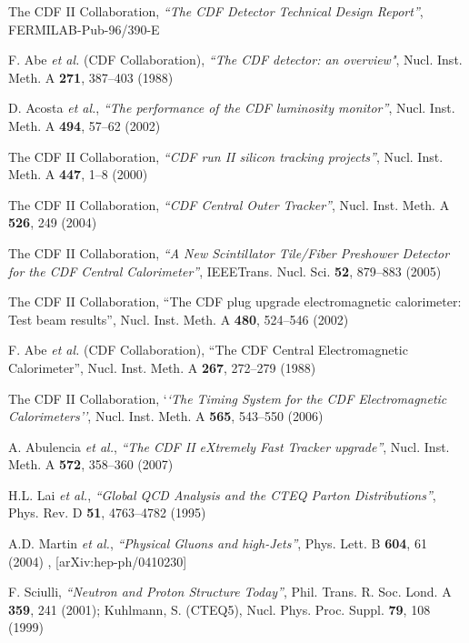 \begin{thebibliography}{1}
 The CDF II Collaboration, \textit{``The CDF Detector Technical Design Report''}, FERMILAB-Pub-96/390-E

 F. Abe \textit{et al.} (CDF Collaboration), \textit{``The CDF detector: an overview"}, Nucl. Inst. Meth. A \textbf{271}, 387--403 (1988)

 D. Acosta \textit{et al.}, \textit{``The performance of the CDF luminosity monitor''}, Nucl. Inst. Meth. A \textbf{494}, 57--62 (2002)

 The CDF II Collaboration, \textit{``CDF run II silicon tracking projects''}, Nucl. Inst. Meth. A \textbf{447}, 1--8 (2000)

 The CDF II Collaboration, \textit{``CDF Central Outer Tracker''}, Nucl. Inst. Meth. A \textbf{526}, 249 (2004)

 The CDF II Collaboration, \textit{``A New Scintillator Tile/Fiber Preshower Detector for the CDF Central Calorimeter''}, IEEETrans. Nucl. Sci. \textbf{52}, 879--883 (2005)

 The CDF II Collaboration, ``The CDF plug upgrade electromagnetic calorimeter: Test beam results'', Nucl. Inst. Meth. A \textbf{480}, 524--546 (2002)

 F. Abe \textit{et al.} (CDF Collaboration), ``The CDF Central Electromagnetic Calorimeter'', Nucl. Inst. Meth. A \textbf{267}, 272--279 (1988)

 The CDF II Collaboration, `\textit{`The Timing System for the CDF Electromagnetic Calorimeters''}, Nucl. Inst. Meth. A \textbf{565}, 543--550 (2006)

 A. Abulencia \textit{et al.}, \textit{``The CDF II eXtremely Fast Tracker upgrade''}, Nucl. Inst. Meth. A \textbf{572}, 358--360 (2007)

 H.L. Lai \textit{et al.}, \textit{``Global QCD Analysis and the CTEQ Parton Distributions''}, Phys. Rev. D \textbf{51}, 4763--4782 (1995)

 A.D. Martin {\it et al.}, \textit{``Physical Gluons and high-\et Jets''}, Phys. Lett. B \textbf{604}, 61 (2004) , [arXiv:hep-ph/0410230]

 F. Sciulli, \textit{``Neutron and Proton Structure Today''}, Phil. Trans. R. Soc. Lond. A \textbf{359}, 241 (2001); Kuhlmann, S. (CTEQ5), Nucl. Phys. Proc. Suppl. \textbf{79}, 108 (1999)


\end{thebibliography}

